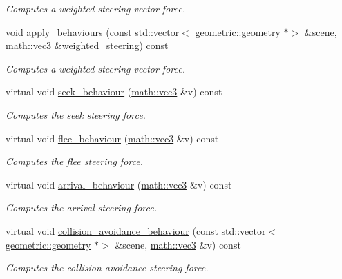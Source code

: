 \begin{DoxyCompactItemize}
\begin{DoxyCompactList}\small\item\em Computes a weighted steering vector force. \end{DoxyCompactList}\item 
void \hyperlink{classphysim_1_1particles_1_1agent__particle_abd9976b5fd7b03ef4301878085e21fbc}{apply\+\_\+behaviours} (const std\+::vector$<$ \hyperlink{classphysim_1_1geometric_1_1geometry}{geometric\+::geometry} $\ast$$>$ \&scene, \hyperlink{structphysim_1_1math_1_1vec3}{math\+::vec3} \&weighted\+\_\+steering) const
\begin{DoxyCompactList}\small\item\em Computes a weighted steering vector force. \end{DoxyCompactList}\item 
virtual void \hyperlink{classphysim_1_1particles_1_1agent__particle_ac4eabcfb94d1c5769415f8822556be8b}{seek\+\_\+behaviour} (\hyperlink{structphysim_1_1math_1_1vec3}{math\+::vec3} \&v) const
\begin{DoxyCompactList}\small\item\em Computes the seek steering force. \end{DoxyCompactList}\item 
virtual void \hyperlink{classphysim_1_1particles_1_1agent__particle_aca72133a2c84d5849185cbe8daf8910f}{flee\+\_\+behaviour} (\hyperlink{structphysim_1_1math_1_1vec3}{math\+::vec3} \&v) const
\begin{DoxyCompactList}\small\item\em Computes the flee steering force. \end{DoxyCompactList}\item 
virtual void \hyperlink{classphysim_1_1particles_1_1agent__particle_a2859f442bcd33d39767e15d882ba5229}{arrival\+\_\+behaviour} (\hyperlink{structphysim_1_1math_1_1vec3}{math\+::vec3} \&v) const
\begin{DoxyCompactList}\small\item\em Computes the arrival steering force. \end{DoxyCompactList}\item 
virtual void \hyperlink{classphysim_1_1particles_1_1agent__particle_a776246cbbc1550db54368039db73d51b}{collision\+\_\+avoidance\+\_\+behaviour} (const std\+::vector$<$ \hyperlink{classphysim_1_1geometric_1_1geometry}{geometric\+::geometry} $\ast$$>$ \&scene, \hyperlink{structphysim_1_1math_1_1vec3}{math\+::vec3} \&v) const
\begin{DoxyCompactList}\small\item\em Computes the collision avoidance steering force. \end{DoxyCompactList}\end{DoxyCompactItemize}

